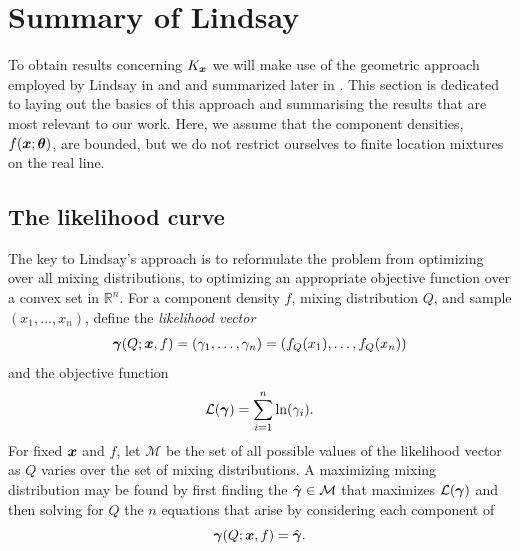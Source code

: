 \section{Summary of Lindsay}
\label{sec:summary of Lindsay}
	To obtain results concerning $K_{\bm{{x}}}$ we will make use of the geometric approach employed by Lindsay in \cite{Lindsay1983-tf} and \cite{Lindsay1983a-he} and summarized later in \cite[Chapter 5]{Lindsay1995-sq}. This section is dedicated to laying out the basics of this approach and summarising the results that are most relevant to our work. Here, we assume that the component densities, $f({\bm{{x}}};{\bm{{\theta}}})$, are bounded, but we do not restrict ourselves to finite location mixtures on the real line.

	\subsection{The likelihood curve}
	The key to Lindsay's approach is to reformulate the problem from optimizing over all mixing distributions, to optimizing an appropriate objective function over a convex set in $\mathbb{R}^n$. For a component density $f$, mixing distribution $Q$, and sample $(x_1, \dots, x_n)$, define the \emph{likelihood vector}
	\begin{equation}
		{\bm{{\gamma}}}(Q;{\bm{{x}}}, f) = (\gamma_1, \dots, \gamma_n) = (f_Q(x_1), \dots, f_Q(x_n))
		\label{eq:likelihood vector}
	\end{equation}
	and the objective function
	\begin{equation}
		\mathcal{L}({\bm{{\gamma}}}) = \sum_{i = 1}^n \ln(\gamma_i).
	\end{equation}
	For fixed ${\bm{{x}}}$ and $f$, let $\mathcal{M}$ be the set of all possible values of the likelihood vector as $Q$ varies over the set of mixing distributions.
	A maximizing mixing distribution may be found by first finding the $\hat{{\bm{{\gamma}}}} \in \mathcal{M}$ that maximizes $\mathcal{L}({\bm{{\gamma}}})$ and then solving for $Q$ the $n$ equations that arise by considering each component of 
	\begin{equation}
		{\bm{{\gamma}}}(Q; {\bm{{x}}}, f) = \hat{{\bm{{\gamma}}}}.
	\end{equation}

